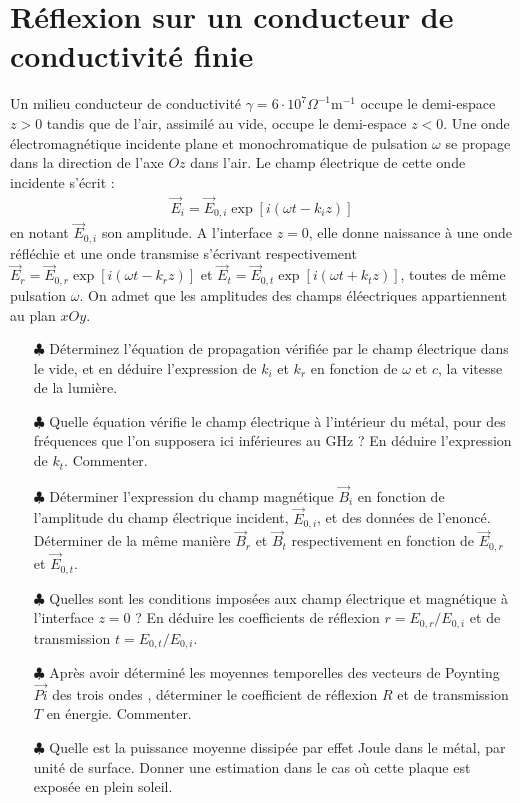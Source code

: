 \documentclass{report}
\begin{document}
\newpage

\section*{Réflexion sur un conducteur de conductivité finie}

Un milieu conducteur de conductivité $\gamma=6\cdot10^7\Omega^{-1}$m$^{-1}$ occupe le demi-espace $z>0$ tandis que de l'air, assimilé au vide, occupe le demi-espace $z<0$. Une onde électromagnétique incidente plane et monochromatique de pulsation $\omega$ se propage dans la direction de l'axe $Oz$ dans l'air. Le champ électrique de cette onde incidente s'écrit :
\begin{align*}
	\vec{E}_i=\vec{E}_{0,i}\exp[i(\omega t-k_iz)]
\end{align*}
en notant $\vec{E}_{0,i}$ son amplitude.
A l'interface $z=0$, elle donne naissance à une onde réfléchie et une onde transmise s'écrivant respectivement $\vec{E}_r=\vec{E}_{0,r}\exp[i(\omega t-k_rz)]$ et $\vec{E}_t=\vec{E}_{0,t}\exp[i(\omega t+k_tz)]$, toutes de même pulsation $\omega$. On admet que les amplitudes des champs éléectriques appartiennent au plan $xOy$.

\begin{itemize}
	
	\item[$\clubsuit$] Déterminez l'équation de propagation vérifiée par le champ électrique dans le vide, et en déduire l'expression de $k_i$ et $k_r$ en fonction de $\omega$ et $c$, la vitesse de la lumière. 
	
	\item[$\clubsuit$] Quelle équation vérifie le champ électrique à l'intérieur du métal, pour des fréquences que l'on supposera ici inférieures au GHz ? En déduire l'expression de $k_t$. Commenter. 
	
	\item[$\clubsuit$] Déterminer l'expression du champ magnétique $\vec{B}_i$ en fonction de l'amplitude du champ électrique incident, $\vec{E}_{0,i}$, et des données de l'enoncé. Déterminer de la même manière $\vec{B}_r$ et $\vec{B}_t$ respectivement en fonction de $\vec{E}_{0,r}$ et $\vec{E}_{0,t}$.
	
	\item[$\clubsuit$] Quelles sont les conditions imposées aux champ électrique et magnétique à l'interface $z=0$ ? En déduire les coefficients de réflexion $r=E_{0,r}/E_{0,i}$ et de transmission $t=E_{0,t}/E_{0,i}$.
	
	\item[$\clubsuit$] Après avoir déterminé les moyennes temporelles des vecteurs de Poynting $\vec{Pi}$ des trois ondes	, déterminer le coefficient de réflexion $R$ et de transmission $T$ en énergie. Commenter.
	
	\item[$\clubsuit$] Quelle est la puissance moyenne dissipée par effet Joule dans le métal, par unité de surface. Donner une estimation dans le cas où cette plaque est exposée en plein soleil.
	
\end{itemize}
\end{document}
